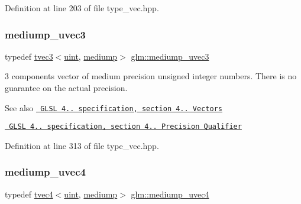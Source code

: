 Definition at line 203 of file type\+\_\+vec.\+hpp.

\mbox{\label{group__core__precision_ga628d87a2d3b8e287d569c6eb12d8e051}} 
\subsubsection{\texorpdfstring{mediump\_uvec3}{mediump\_uvec3}}
{\footnotesize\ttfamily typedef \mbox{\hyperlink{structglm_1_1tvec3}{tvec3}}$<$\mbox{\hyperlink{group__core__precision_ga4fd29415871152bfb5abd588334147c8}{uint}}, \mbox{\hyperlink{namespaceglm_a0f04f086094c747d227af4425893f545a6416f3ea0c9025fb21ed50c4d6620482}{mediump}}$>$ \mbox{\hyperlink{group__core__precision_ga628d87a2d3b8e287d569c6eb12d8e051}{glm\+::mediump\+\_\+uvec3}}}

3 components vector of medium precision unsigned integer numbers. There is no guarantee on the actual precision.

\begin{DoxySeeAlso}{See also}
\href{http://www.opengl.org/registry/doc/GLSLangSpec.4.20.8.pdf}{\texttt{ G\+L\+SL 4.. specification, section 4.. Vectors}} 

\href{http://www.opengl.org/registry/doc/GLSLangSpec.4.20.8.pdf}{\texttt{ G\+L\+SL 4.. specification, section 4.. Precision Qualifier}} 
\end{DoxySeeAlso}


Definition at line 313 of file type\+\_\+vec.\+hpp.

\mbox{\label{group__core__precision_ga825e1e6ef3513c5de283d1b2fa1d4879}} 
\subsubsection{\texorpdfstring{mediump\_uvec4}{mediump\_uvec4}}
{\footnotesize\ttfamily typedef \mbox{\hyperlink{structglm_1_1tvec4}{tvec4}}$<$\mbox{\hyperlink{group__core__precision_ga4fd29415871152bfb5abd588334147c8}{uint}}, \mbox{\hyperlink{namespaceglm_a0f04f086094c747d227af4425893f545a6416f3ea0c9025fb21ed50c4d6620482}{mediump}}$>$ \mbox{\hyperlink{group__core__precision_ga825e1e6ef3513c5de283d1b2fa1d4879}{glm\+::mediump\+\_\+uvec4}}}

